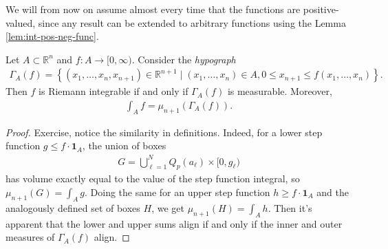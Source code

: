 \begin{remark}
	We will from now on assume almost every time that the functions are positive-valued, since any result can be extended to arbitrary functions using the Lemma \ref{lem:int-pos-neg-func}.
\end{remark}

\begin{lemma}\label{lem:jordan-and-riemann}
	Let $A \subset \mathbb{R}^{n}$ and $f: A \to [0,\infty)$. Consider the \textit{hypograph}
	\begin{align*}
		\Gamma_{A}(f) = \left\{ (x_{1}, \dots, x_{n}, x_{n+1}) \in \mathbb{R}^{n+1} \mid (x_{1}, \dots, x_{n}) \in A, 0 \leq x_{n+1} \leq f(x_{1}, \dots, x_{n}) \right\}.
	\end{align*}
	Then $f$ is Riemann integrable if and only if $\Gamma_{A}(f)$ is measurable. Moreover,
	\begin{align*}
		\int_{A} f = \mu_{n+1}(\Gamma_{A}(f)).
	\end{align*}
\end{lemma}
\begin{proof}
	Exercise, notice the similarity in definitions. Indeed, for a lower step function $g \leq f \cdot \boldsymbol{1}_{A}$, the union of boxes
	\begin{align*}
		G = \bigcup_{\ell = 1}^{N} Q_{p}(a_{\ell}) \times [0,g_{\ell})
	\end{align*}
	has volume exactly equal to the value of the step function integral, so $\mu_{n+1}(G) = \int_{A} g$. Doing the same for an upper step function $h \geq f \cdot \boldsymbol{1}_{A}$ and the analogously defined set of boxes $H$, we get $\mu_{n+1}(H) = \int_{A} h$. Then it's apparent that the lower and upper sums align if and only if the inner and outer measures of $\Gamma_{A}(f)$ align.
\end{proof}

